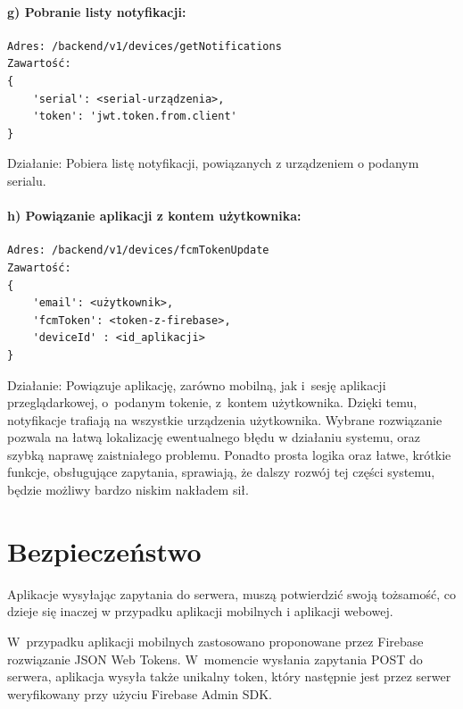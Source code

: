 \paragraph{g) Pobranie listy notyfikacji:}
\begin{verbatim}
Adres: /backend/v1/devices/getNotifications
Zawartość: 
{
	'serial': <serial-urządzenia>,  
	'token': 'jwt.token.from.client'
}
\end{verbatim}
Działanie: Pobiera listę notyfikacji, powiązanych z urządzeniem o podanym serialu.
\paragraph{h) Powiązanie aplikacji z kontem użytkownika:}
\begin{verbatim}
Adres: /backend/v1/devices/fcmTokenUpdate
Zawartość: 
{
	'email': <użytkownik>, 
	'fcmToken': <token-z-firebase>, 
	'deviceId' : <id_aplikacji>
}
\end{verbatim}
Działanie: Powiązuje aplikację, zarówno mobilną, jak i~sesję aplikacji przeglądarkowej, o~podanym tokenie, z~kontem użytkownika. Dzięki temu, notyfikacje trafiają na wszystkie urządzenia użytkownika.
\newline
\newline
Wybrane rozwiązanie pozwala na łatwą lokalizację ewentualnego błędu w działaniu systemu, oraz szybką naprawę zaistniałego problemu. Ponadto prosta logika oraz łatwe, krótkie funkcje, obsługujące zapytania, sprawiają, że dalszy rozwój tej części systemu, będzie możliwy bardzo niskim nakładem sił. 

\section{Bezpieczeństwo}

Aplikacje wysyłając zapytania do serwera, muszą potwierdzić swoją tożsamość, co dzieje się inaczej w przypadku aplikacji mobilnych i aplikacji webowej.

W~przypadku aplikacji mobilnych zastosowano proponowane przez Firebase rozwiązanie JSON Web Tokens. W~momencie wysłania zapytania POST do serwera, aplikacja wysyła także unikalny token, który następnie jest przez serwer weryfikowany przy użyciu Firebase Admin SDK.

